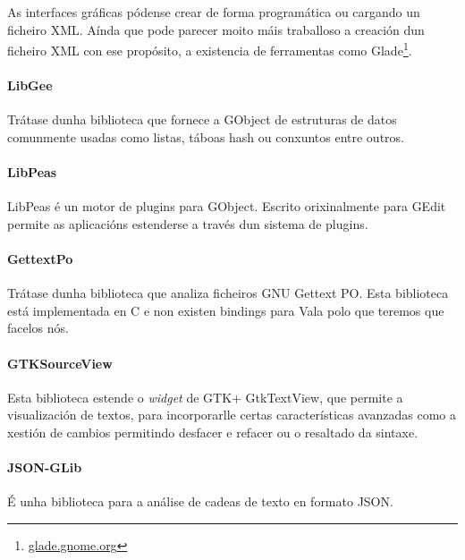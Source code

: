 As interfaces gráficas pódense crear de forma programática ou cargando un ficheiro XML. Aínda que pode parecer moito máis traballoso a creación dun ficheiro XML con ese propósito, a existencia de ferramentas como Glade\footnote{\href{http://glade.gnome.org}{glade.gnome.org}}.

\paragraph{LibGee} Trátase dunha biblioteca que fornece a GObject de estruturas de datos comunmente usadas como listas, táboas hash ou conxuntos entre outros.

\paragraph{LibPeas} LibPeas é un motor de plugins para GObject. Escrito orixinalmente para GEdit permite as aplicacións estenderse a través dun sistema de plugins.

\paragraph{GettextPo} Trátase dunha biblioteca que analiza ficheiros GNU Gettext PO. Esta biblioteca está implementada en C e non existen bindings para Vala polo que teremos que facelos nós.

\paragraph{GTKSourceView} Esta biblioteca estende o \emph{widget} de GTK+ GtkTextView, que permite a visualización de textos, para incorporarlle certas características avanzadas como a xestión de cambios permitindo desfacer e refacer ou o resaltado da sintaxe.

\paragraph{JSON-GLib} É unha biblioteca para a análise de cadeas de texto en formato JSON.
